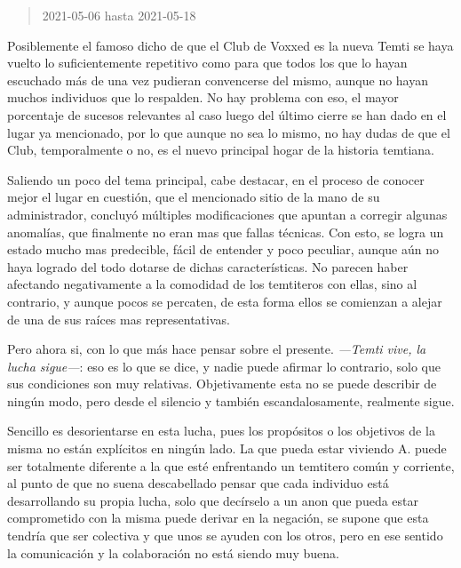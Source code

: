 \documentclass[
  spanish,
]{book}
\begin{document}
\begin{quote}
2021-05-06 hasta 2021-05-18
\end{quote}

Posiblemente el famoso dicho de que el Club de Voxxed es la nueva Temti se haya vuelto lo suficientemente repetitivo como para que todos los que lo hayan escuchado más de una vez pudieran convencerse del mismo, aunque no hayan muchos individuos que lo respalden. No hay problema con eso, el mayor porcentaje de sucesos relevantes al caso luego del último cierre se han dado en el lugar ya mencionado, por lo que aunque no sea lo mismo, no hay dudas de que el Club, temporalmente o no, es el nuevo principal hogar de la historia temtiana.

Saliendo un poco del tema principal, cabe destacar, en el proceso de conocer mejor el lugar en cuestión, que el mencionado sitio de la mano de su administrador, concluyó múltiples modificaciones que apuntan a corregir algunas anomalías, que finalmente no eran mas que fallas técnicas. Con esto, se logra un estado mucho mas predecible, fácil de entender y poco peculiar, aunque aún no haya logrado del todo dotarse de dichas características. No parecen haber afectando negativamente a la comodidad de los temtiteros con ellas, sino al contrario, y aunque pocos se percaten, de esta forma ellos se comienzan a alejar de una de sus raíces mas representativas.

Pero ahora si, con lo que más hace pensar sobre el presente. \emph{---Temti vive, la lucha sigue---}: eso es lo que se dice, y nadie puede afirmar lo contrario, solo que sus condiciones son muy relativas. Objetivamente esta no se puede describir de ningún modo, pero desde el silencio y también escandalosamente, realmente sigue.

Sencillo es desorientarse en esta lucha, pues los propósitos o los objetivos de la misma no están explícitos en ningún lado. La que pueda estar viviendo A. puede ser totalmente diferente a la que esté enfrentando un temtitero común y corriente, al punto de que no suena descabellado pensar que cada individuo está desarrollando su propia lucha, solo que decírselo a un anon que pueda estar comprometido con la misma puede derivar en la negación, se supone que esta tendría que ser colectiva y que unos se ayuden con los otros, pero en ese sentido la comunicación y la colaboración no está siendo muy buena.
\end{document}

